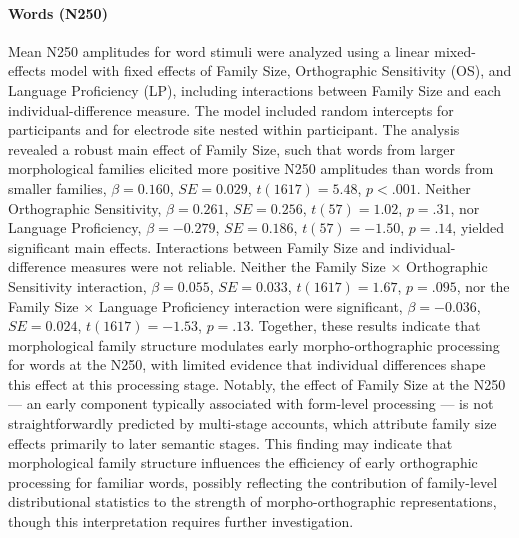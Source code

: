 \paragraph*{Words (N250)}
Mean N250 amplitudes for word stimuli were analyzed using a linear mixed-effects model with fixed effects of Family Size, Orthographic Sensitivity (OS), and Language Proficiency (LP), including interactions between Family Size and each individual-difference measure. The model included random intercepts for participants and for electrode site nested within participant. The analysis revealed a robust main effect of Family Size, such that words from larger morphological families elicited more positive N250 amplitudes than words from smaller families, $\beta = 0.160$, $SE = 0.029$, $t(1617) = 5.48$, $p < .001$. Neither Orthographic Sensitivity, $\beta = 0.261$, $SE = 0.256$, $t(57) = 1.02$, $p = .31$, nor Language Proficiency, $\beta = -0.279$, $SE = 0.186$, $t(57) = -1.50$, $p = .14$, yielded significant main effects. Interactions between Family Size and individual-difference measures were not reliable. Neither the Family Size × Orthographic Sensitivity interaction, $\beta = 0.055$, $SE = 0.033$, $t(1617) = 1.67$, $p = .095$, nor the Family Size × Language Proficiency interaction were significant, $\beta = -0.036$, $SE = 0.024$, $t(1617) = -1.53$, $p = .13$. Together, these results indicate that morphological family structure modulates early morpho-orthographic processing for words at the N250, with limited evidence that individual differences shape this effect at this processing stage. Notably, the effect of Family Size at the N250 — an early component typically associated with form-level processing — is not straightforwardly predicted by multi-stage accounts, which attribute family size effects primarily to later semantic stages. This finding may indicate that morphological family structure influences the efficiency of early orthographic processing for familiar words, possibly reflecting the contribution of family-level distributional statistics to the strength of morpho-orthographic representations, though this interpretation requires further investigation.

